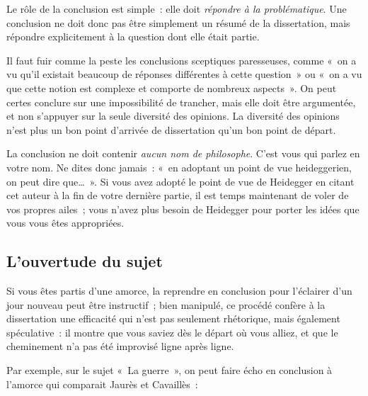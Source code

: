 \documentclass[a4paper]{article}
\begin{document}
Le rôle de la conclusion est simple : elle doit \emph{répondre à la problématique}. Une conclusion ne doit donc pas être simplement un
résumé de la dissertation, mais répondre explicitement à la question
dont elle était partie.

Il faut fuir comme la peste les conclusions sceptiques paresseuses,
comme « on a vu qu'il existait beaucoup de réponses différentes à cette
question » ou « on a vu que cette notion est complexe et comporte de
nombreux aspects ». On peut certes conclure sur une impossibilité de
trancher, mais elle doit être argumentée, et non s'appuyer sur la seule
diversité des opinions. La diversité des opinions n'est plus un bon
point d'arrivée de dissertation qu'un bon point de départ.

La conclusion ne doit contenir \emph{aucun nom de philosophe}. C'est vous qui
parlez en votre nom. Ne dites donc jamais : « en adoptant un point de vue
heideggerien, on peut dire que\ldots{} ». Si vous avez adopté le point de vue
de Heidegger en citant cet auteur à la fin de votre dernière partie, il
est temps maintenant de voler de vos propres ailes ; vous n'avez plus
besoin de Heidegger pour porter les idées que vous vous êtes
appropriées.
\subsection{L'ouvertude du sujet}
\label{sec-4-2}


Si vous êtes partis d'une amorce, la reprendre en conclusion pour
l'éclairer d'un jour nouveau peut être instructif ; bien manipulé, ce
procédé confère à la dissertation une efficacité qui n'est pas seulement
rhétorique, mais également spéculative : il montre que vous saviez dès
le départ où vous alliez, et que le cheminement n'a pas été improvisé
ligne après ligne.

Par exemple, sur le sujet « La guerre », on peut faire écho en conclusion
à l'amorce qui comparait Jaurès et Cavaillès :
\end{document}
